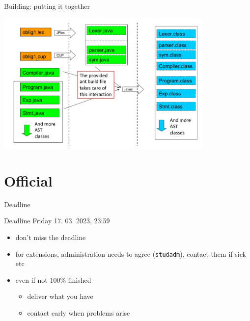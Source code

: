 \documentclass{beamer}
\begin{document}
\begin{frame}[label={sec:orgd32731b}]{Building: putting it together}

\begin{center}
 \includegraphics[width=0.8\textwidth]{figures/snaps/buildprocess}
\end{center}
\end{frame}

\section{Official}
\label{sec:orgf1a6c15}

\begin{frame}[label={sec:org3bd377a},fragile]{Deadline}
 \begin{alertblock}{Deadline}
\alert{Friday 17. 03. 2023, 23:59}
\end{alertblock}


\begin{itemize}
\item don't miss the deadline
\item for extensions, administration needs to agree (\texttt{studadm}), contact them
if sick etc
\item even if not 100\% finished
\begin{itemize}
\item deliver what you have
\item contact early when problems arise
\end{itemize}
\end{itemize}
\end{frame}
\end{document}
